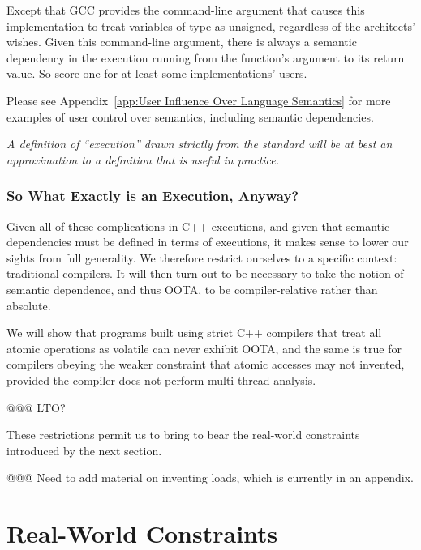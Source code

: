 \documentclass[10]{article}
\begin{document}
Except that GCC provides the  command-line
argument that causes this implementation to treat variables of
type  as unsigned, regardless of the architects' wishes.
Given this command-line argument, there is always a semantic dependency
in the execution running from the  function's argument to its
return value.
So score one for at least some implementations' users.

Please see Appendix~\ref{app:User Influence Over Language Semantics}
for more examples of user control over semantics, including semantic
dependencies.

\emph{A definition of ``execution'' drawn strictly from the standard will
be at best an approximation to a definition that is useful in practice.}

\subsubsection{So What Exactly is an Execution, Anyway?}
\label{sec:So What Exactly is an Execution, Anyway?}

Given all of these complications in C++ executions, and given that
semantic dependencies must be defined in terms of executions, it makes
sense to lower our sights from full generality.
We therefore restrict ourselves to a specific context:
traditional compilers.
It will then turn out to be necessary to take the notion of semantic
dependence, and thus OOTA, to be compiler-relative rather than absolute.

We will show that programs built using strict C++ compilers that treat all
atomic operations as volatile can never exhibit OOTA, and the same is true
for compilers obeying the weaker constraint that atomic accesses may not
invented, provided the compiler does not perform multi-thread analysis.

@@@ LTO?

These restrictions permit us to bring to bear the real-world
constraints introduced by the next section.

@@@  Need to add material on inventing loads, which is currently
in an appendix.

\section{Real-World Constraints}
\label{sec:Real-World Constraints}
\end{document}
